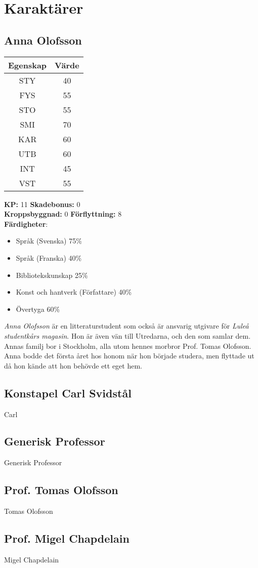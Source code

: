 \section{Karaktärer}
\subsection{Anna Olofsson}
\label{kar:AnnaOlofsson}
\begin{center}
	\begin{tabular}{ | c | c | }
		\hline
		Egenskap & Värde \\
		\hline
		STY & 40 \\
		FYS & 55 \\
		STO & 55 \\
		SMI & 70 \\
		KAR & 60 \\
		UTB & 60 \\
		INT & 45 \\
		VST & 55 \\
		\hline
	\end{tabular}
\end{center}
%
\textbf{KP:} 11 \quad \textbf{Skadebonus:} 0 \\
\textbf{Kroppsbyggnad:} 0 \quad \textbf{Förflyttning:} 8
\\
\textbf{Färdigheter}:
\begin{itemize}
	\item Språk (Svenska) 75\%
	\item Språk (Franska) 40\%
	\item Bibliotekskunskap 25\%
	\item Konst och hantverk (Författare) 40\%
	\item Övertyga 60\%
\end{itemize}
%
\textit{Anna Olofsson} är en litteraturstudent som också är ansvarig utgivare för \textit{Luleå studentkårs magasin}. Hon är även vän till Utredarna, och den som samlar dem. Annas familj bor i Stockholm, alla utom hennes morbror Prof. Tomas Olofsson. Anna bodde det första året hos honom när hon började studera, men flyttade ut då hon kände att hon behövde ett eget hem.
%
\subsection{Konstapel Carl Svidstål}
\label{kar:KonstapelCarlSvidstal}
Carl
%
\subsection{Generisk Professor}
\label{kar:GeneriskProfessor}
Generisk Professor
%
\subsection{Prof. Tomas Olofsson}
\label{kar:TomasOlofsson}
Tomas Olofsson
%
\subsection{Prof. Migel Chapdelain}
\label{kar:MigelChapdelain}
Migel Chapdelain
